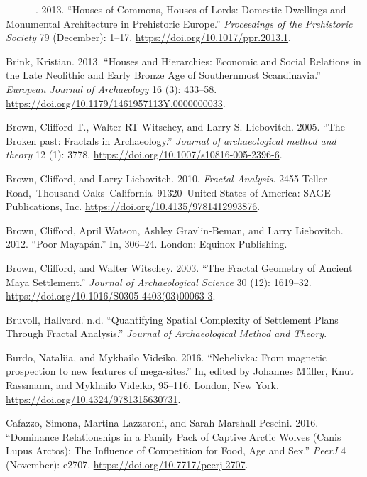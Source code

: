 \documentclass[
  12pt,
  a4paper, twoside]{book}
\newlength{\cslhangindent}
\newlength{\cslentryspacingunit} %
\newenvironment{CSLReferences}[2] %
 {%
  \setlength{\parindent}{0pt}
  \ifodd #1
  \let\oldpar\par
  \def\par{\hangindent=\cslhangindent\oldpar}
  \fi
  \setlength{\parskip}{#2\cslentryspacingunit}
 }%
 {}
\begin{document}
\begin{CSLReferences}{1}{0}
\leavevmode{}%
---------. 2013. {``Houses of Commons, Houses of Lords: Domestic Dwellings and Monumental Architecture in Prehistoric Europe.''} \emph{Proceedings of the Prehistoric Society} 79 (December): 1--17. \url{https://doi.org/10.1017/ppr.2013.1}.

\leavevmode{}%
Brink, Kristian. 2013. {``Houses and Hierarchies: Economic and Social Relations in the Late Neolithic and Early Bronze Age of Southernmost Scandinavia.''} \emph{European Journal of Archaeology} 16 (3): 433--58. \url{https://doi.org/10.1179/1461957113Y.0000000033}.

\leavevmode{}%
Brown, Clifford T., Walter RT Witschey, and Larry S. Liebovitch. 2005. {``The Broken past: Fractals in Archaeology.''} \emph{Journal of archaeological method and theory} 12 (1): 3778. \url{https://doi.org/10.1007/s10816-005-2396-6}.

\leavevmode{}%
Brown, Clifford, and Larry Liebovitch. 2010. \emph{Fractal Analysis}. 2455 Teller Road,~Thousand Oaks~California~91320~United States of America: SAGE Publications, Inc. \url{https://doi.org/10.4135/9781412993876}.

\leavevmode{}%
Brown, Clifford, April Watson, Ashley Gravlin-Beman, and Larry Liebovitch. 2012. {``Poor Mayapán.''} In, 306--24. London: Equinox Publishing.

\leavevmode{}%
Brown, Clifford, and Walter Witschey. 2003. {``The Fractal Geometry of Ancient Maya Settlement.''} \emph{Journal of Archaeological Science} 30 (12): 1619--32. \url{https://doi.org/10.1016/S0305-4403(03)00063-3}.

\leavevmode{}%
Bruvoll, Hallvard. n.d. {``Quantifying Spatial Complexity of Settlement Plans Through Fractal Analysis.''} \emph{Journal of Archaeological Method and Theory}.

\leavevmode{}%
Burdo, Nataliia, and Mykhailo Videiko. 2016. {``Nebelivka: From magnetic prospection to new features of mega-sites.''} In, edited by Johannes Müller, Knut Rassmann, and Mykhailo Videiko, 95--116. London, New York. \url{https://doi.org/10.4324/9781315630731}.

\leavevmode{}%
Cafazzo, Simona, Martina Lazzaroni, and Sarah Marshall-Pescini. 2016. {``Dominance Relationships in a Family Pack of Captive Arctic Wolves (Canis Lupus Arctos): The Influence of Competition for Food, Age and Sex.''} \emph{PeerJ} 4 (November): e2707. \url{https://doi.org/10.7717/peerj.2707}.


\end{CSLReferences}
\end{document}
